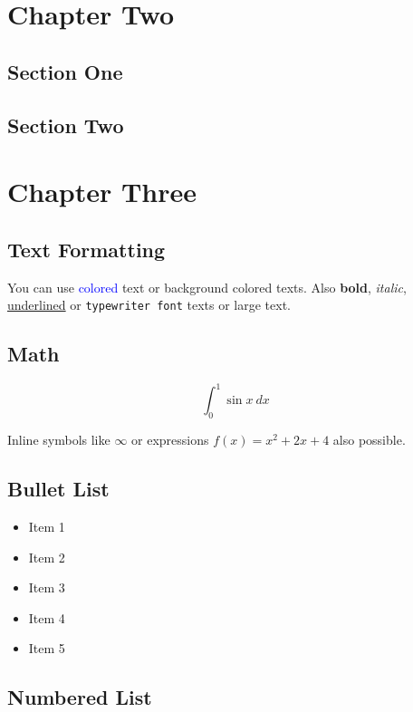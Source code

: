 \documentclass[12pt, twoside]{book}
\begin{document}
\chapter{Chapter Two}

\section{Section One}
\blindtext[3]

\section{Section Two}
\blindtext

\chapter{Chapter Three}

\section{Text Formatting}
You can use \textcolor{blue}{colored} text or
\colorbox{BurntOrange}{background colored} texts. Also
\textbf{bold}, \textit{italic}, \underline{underlined} or
\texttt{typewriter font} texts or \large{large} text.

\section{Math}
$$\int_0^1{\sin x} \ dx$$

Inline symbols like $\infty$ or expressions $f(x) = x^2 + 2x + 4$ also possible.

\section{Bullet List}

\begin{itemize}
    \item Item 1
    \item Item 2
    \item Item 3
    \item Item 4
    \item Item 5
\end{itemize}

\section{Numbered List}
\end{document}
